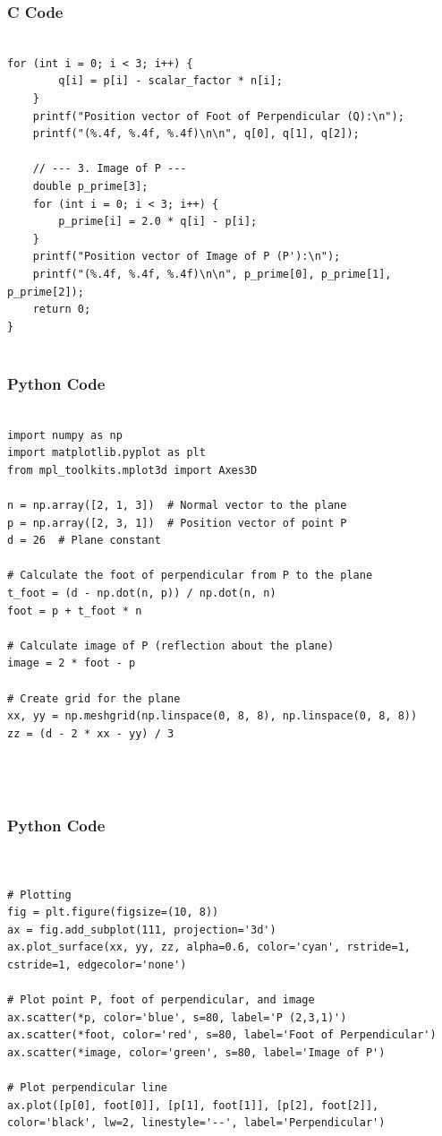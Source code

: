 \documentclass{beamer}
\begin{document}
\begin{frame}[fragile]
    \frametitle{C Code}
    \begin{lstlisting}

for (int i = 0; i < 3; i++) {
        q[i] = p[i] - scalar_factor * n[i];
    }
    printf("Position vector of Foot of Perpendicular (Q):\n");
    printf("(%.4f, %.4f, %.4f)\n\n", q[0], q[1], q[2]);

    // --- 3. Image of P ---
    double p_prime[3];
    for (int i = 0; i < 3; i++) {
        p_prime[i] = 2.0 * q[i] - p[i];
    }
    printf("Position vector of Image of P (P'):\n");
    printf("(%.4f, %.4f, %.4f)\n\n", p_prime[0], p_prime[1], p_prime[2]);
    return 0;
}


    \end{lstlisting}
\end{frame}


\begin{frame}[fragile]
    \frametitle{Python Code}
    \begin{lstlisting}

import numpy as np
import matplotlib.pyplot as plt
from mpl_toolkits.mplot3d import Axes3D

n = np.array([2, 1, 3])  # Normal vector to the plane
p = np.array([2, 3, 1])  # Position vector of point P
d = 26  # Plane constant

# Calculate the foot of perpendicular from P to the plane
t_foot = (d - np.dot(n, p)) / np.dot(n, n)
foot = p + t_foot * n

# Calculate image of P (reflection about the plane)
image = 2 * foot - p

# Create grid for the plane
xx, yy = np.meshgrid(np.linspace(0, 8, 8), np.linspace(0, 8, 8))
zz = (d - 2 * xx - yy) / 3




    \end{lstlisting}
\end{frame}


\begin{frame}[fragile]
    \frametitle{Python Code}
    \begin{lstlisting}


# Plotting
fig = plt.figure(figsize=(10, 8))
ax = fig.add_subplot(111, projection='3d')
ax.plot_surface(xx, yy, zz, alpha=0.6, color='cyan', rstride=1, cstride=1, edgecolor='none')

# Plot point P, foot of perpendicular, and image
ax.scatter(*p, color='blue', s=80, label='P (2,3,1)')
ax.scatter(*foot, color='red', s=80, label='Foot of Perpendicular')
ax.scatter(*image, color='green', s=80, label='Image of P')

# Plot perpendicular line
ax.plot([p[0], foot[0]], [p[1], foot[1]], [p[2], foot[2]], color='black', lw=2, linestyle='--', label='Perpendicular')





    \end{lstlisting}
\end{frame}
\end{document}
